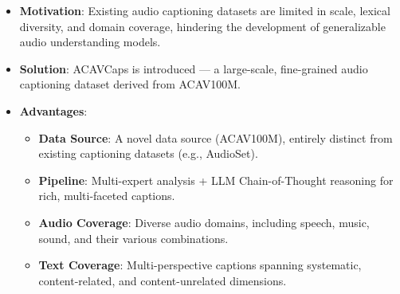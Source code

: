 \begin{itemize}
    \item \textbf{Motivation}: Existing audio captioning datasets are limited in scale, lexical diversity, and domain coverage, hindering the development of generalizable audio understanding models.
    \item \textbf{Solution}: ACAVCaps is introduced --- a large-scale, fine-grained audio captioning dataset derived from ACAV100M.
    \item \textbf{Advantages}:
    \begin{itemize}
        \item \textbf{Data Source}: A novel data source (ACAV100M), entirely distinct from existing captioning datasets (e.g., AudioSet).
        \item \textbf{Pipeline}: Multi-expert analysis + LLM Chain-of-Thought reasoning for rich, multi-faceted captions.
        \item \textbf{Audio Coverage}: Diverse audio domains, including speech, music, sound, and their various combinations.
        \item \textbf{Text Coverage}: Multi-perspective captions spanning systematic, content-related, and content-unrelated dimensions.
    \end{itemize}
\end{itemize}
